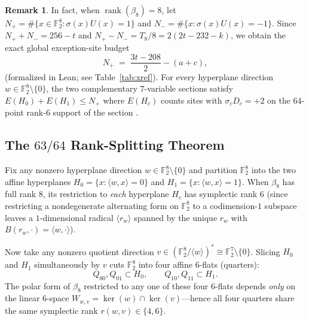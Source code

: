 \documentclass[11pt]{article}
\theoremstyle{definition}
\newtheorem{remark}[theorem]{Remark}
\newcommand{\F}{\mathbb{F}}
\newcommand{\rank}{\operatorname{rank}}
\begin{document}
\begin{remark}
In fact, when $\rank(\beta_8) = 8$, let $N_+ = \#\{x \in \F_2^8 : \sigma(x)U(x) = 1\}$ and $N_- = \#\{x : \sigma(x)U(x) = -1\}$. Since $N_+ + N_- = 256 - t$ and $N_+ - N_- = T_8 / 8 = 2(2t - 232 - k)$, we obtain the exact global exception-site budget
\begin{equation}
\label{eq:Nplus}
  N_+ \;=\; \frac{3t - 208}{2} - (a + c),
\end{equation}
(formalized in Lean; see Table~\ref{tab:xref}).
For every hyperplane direction $w \in \F_2^8 \setminus \{0\}$, the two complementary $7$-variable sections satisfy $E(H_0) + E(H_1) \le N_+$ where $E(H_c)$ counts sites with $\sigma_c D_c = +2$ on the $64$-point rank-$6$ support of the section .
\end{remark}

\subsection{The $63/64$ Rank-Splitting Theorem}

Fix any nonzero hyperplane direction $w \in \F_2^8 \setminus \{0\}$ and partition $\F_2^8$ into the two affine hyperplanes $H_0 = \{x : \langle w, x\rangle = 0\}$ and $H_1 = \{x : \langle w, x\rangle = 1\}$.
When $\beta_8$ has full rank $8$, its restriction to \emph{each} hyperplane $H_c$ has symplectic rank $6$ (since restricting a nondegenerate alternating form on $\F_2^8$ to a codimension-$1$ subspace leaves a $1$-dimensional radical $\langle r_w \rangle$ spanned by the unique $r_w$ with $B(r_w, \cdot) = \langle w, \cdot \rangle$).

Now take any nonzero quotient direction $v \in (\F_2^8 / \langle w \rangle)^* \cong \F_2^7 \setminus \{0\}$.
Slicing $H_0$ and $H_1$ simultaneously by $v$ cuts $\F_2^8$ into four affine $6$-flats (quarters):
\[
  Q_{00}, Q_{01} \subset H_0, \qquad Q_{10}, Q_{11} \subset H_1.
\]
The polar form of $\beta_8$ restricted to any one of these four $6$-flats depends \emph{only} on the linear $6$-space $W_{w,v} = \ker(w) \cap \ker(v)$---hence all four quarters share the same symplectic rank $r(w, v) \in \{4, 6\}$.
\end{document}
